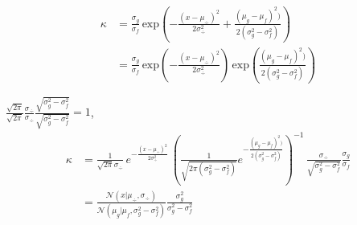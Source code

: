 \documentclass[a4paper,11pt]{book}
\makeatletter
\renewcommand{\frontmatter}{\cleardoublepage\@mainmatterfalse}
\newcommand{\N}{\mathcal{N}}
\theoremstyle{definition}
\newif\ifen
\newif\ifes
\newcommand{\en}[1]{\ifen#1\fi}
\newcommand{\es}[1]{\ifes#1\fi}
\makeatother
\begin{document}
\en{Returning to the original expression}
\begin{equation}
\begin{split}
 \kappa & = \frac{\sigma_g}{\sigma_f}  \, \text{exp}\left(- \frac{(x - \mu_{\div})^2}{2\sigma_{\div}^2} + \frac{(\mu_g - \mu_f)^2)}{2(\sigma_g^2 - \sigma_f^2)}  \right)\\[0.3cm]
 & = \frac{\sigma_g}{\sigma_f} \, \text{exp}\left({-\frac{(x - \mu_{\div})^2}{2\sigma_{\div}^2}}\right) \, \text{exp}\left({\frac{(\mu_g - \mu_f)^2)}{2(\sigma_g^2 - \sigma_f^2)}}\right)
\end{split}
\end{equation}

\en{Multiplying by} $\frac{\sqrt{2\pi}}{\sqrt{2\pi}}\frac{\sigma_{\div}}{\sigma_{\div}}\frac{\sqrt{\sigma_g^2 - \sigma_f^2}}{\sqrt{\sigma_g^2 - \sigma_f^2}}=1$,
\begin{equation}
\begin{split}
 \kappa & =  \frac{1}{\sqrt{2\pi}\sigma_{\div}} \, e^{-\frac{(x - \mu_{\div})^2}{2\sigma_{\div}^2}} \, \left( \frac
 {1}{\sqrt{2\pi(\sigma_g^2 - \sigma_f^2)} } e^{-\frac{(\mu_g - \mu_f)^2)}{2(\sigma_g^2 - \sigma_f^2)}} \right)^{-1} \, \frac{\sigma_{\div}}{\sqrt{\sigma_g^2 - \sigma_f^2}}\frac{\sigma_g}{\sigma_f}\\[0.3cm]
 & = \frac{\N\left(x| \mu_{\div},\sigma_{\div}\right)}{\N\left(\mu_g|\mu_f,\sigma_g^2-\sigma_f^2\right)} \frac{\sigma_g^2}{\sigma_g^2 - \sigma_f^2}
\end{split}
\end{equation}

\frontmatter
\end{document}

